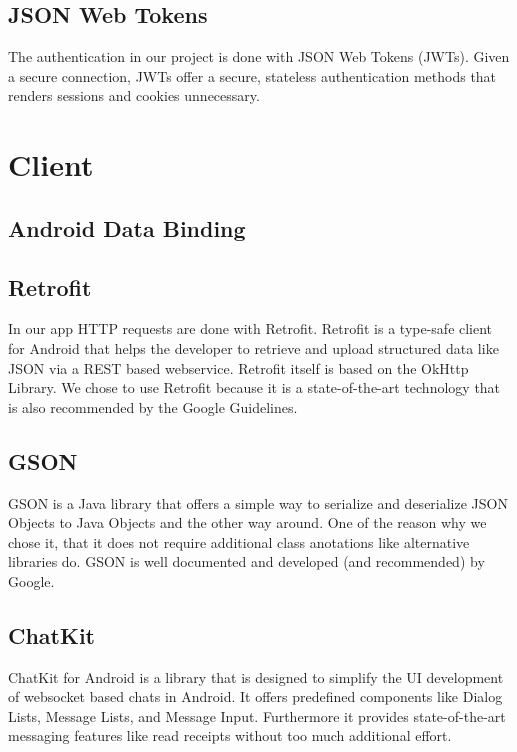 \documentclass[11pt, accentcolor=tud1c]{tudreport}
\begin{document}
\subsection{JSON Web Tokens}\label{sec:json_web_tokens}
The authentication in our project is done with JSON Web Tokens (JWTs)\cite{jwt}. Given a secure connection, JWTs offer a secure, stateless authentication methods that renders sessions and cookies unnecessary.

\section{Client}\label{sec:client}
\subsection{Android Data Binding}
\cite{databinding}
\subsection{Retrofit}
In our app HTTP requests are done with Retrofit\cite{retrofit}. Retrofit is a type-safe client for Android that helps the developer to retrieve and upload structured data like JSON via a REST based webservice. Retrofit itself is based on the OkHttp Library. We chose to use Retrofit because it is a state-of-the-art technology that is also recommended by the Google Guidelines.
\subsection{GSON}
GSON\cite{gson} is a Java library that offers a simple way to serialize and deserialize JSON Objects to Java Objects and the other way around. One of the reason why we chose it, that it does not require additional class anotations like alternative libraries do. GSON is well documented and developed (and recommended) by Google.
\subsection{ChatKit}
ChatKit for Android \cite{chatkit} is a library that is designed to simplify the UI development of websocket based chats in Android. It offers predefined components like Dialog Lists, Message Lists, and Message Input. Furthermore it provides state-of-the-art messaging features like read receipts without too much additional effort.

\end{document}
